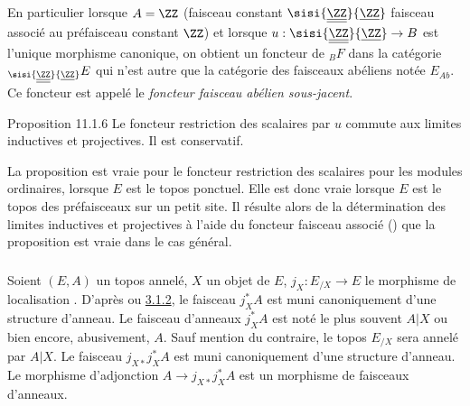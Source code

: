 \subsubsection{}
En particulier lorsque $A=\ZZ$ (faisceau constant $\sisi{\underline{\underline{\ZZ}}}{\underline{\ZZ}}$ \ie faisceau
associé au préfaisceau constant $\ZZ$) et lorsque $u:\sisi{\underline{\underline{\ZZ}}}{\underline{\ZZ}}\rightarrow B$
est l'unique morphisme canonique, on obtient un foncteur de ${}_BF$
dans la catégorie ${}_{\sisi{\underline{\underline{\ZZ}}}{\underline{\ZZ}}}E$ qui n'est autre que la catégorie des
faisceaux abéliens notée $E_{Ab}$. Ce foncteur est appelé le
\emph{foncteur faisceau abélien sous-jacent}.

\begin{enonce*}{Proposition 11.1.6}
Le foncteur restriction des scalaires par $u$ commute aux limites
inductives et projectives. Il est conservatif.
\end{enonce*}

La proposition est vraie pour le foncteur restriction des scalaires
pour les modules ordinaires, \ie lorsque $E$ est le topos ponctuel.
Elle est donc vraie lorsque $E$ est le topos des préfaisceaux sur un
petit site. Il résulte alors de la détermination des limites
inductives et projectives à l'aide du foncteur faisceau associé
() que la proposition est vraie dans le cas général.

\setcounter{subsection}{2} \setcounter{subsubsection}{0}
\subsubsection{}
Soient $(E,A)$ un topos annelé, $X$ un objet de $E$,
$j_X:E_{/X}\rightarrow E$ le morphisme de localisation
. D'après  ou
\hyperref[IV.subsubsec3.1.2]{3.1.2}, le faisceau $j^{\ast}_XA$ est muni
canoniquement d'une structure d'anneau. Le faisceau d'anneaux
$j^{\ast}_XA$ est noté le plus souvent $A| X$ ou bien encore,
abusivement, $A$. Sauf mention du contraire, le topos $E_{/X}$ sera
annelé par $A| X$. Le faisceau $j_{X\ast}j^{\ast}_XA$ est muni
canoniquement d'une structure d'anneau. Le morphisme d'adjonction
$A\rightarrow j_{X\ast}j^{\ast}_XA$ est un morphisme de faisceaux
d'anneaux.

